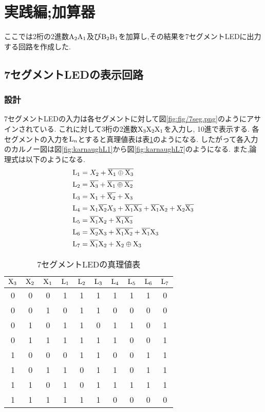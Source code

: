 \section{実践編;加算器}
ここでは2桁の2進数${\rm A_2A_1}$及び${\rm B_2B_1}$を加算し,その結果を7セグメントLEDに出力する回路を作成した.
\subsection{7セグメントLEDの表示回路}
\subsubsection{設計}
7セグメントLEDの入力は各セグメントに対して図\ref{fig:fig/7seg.png}のようにアサインされている.
これに対して3桁の2進数${\rm X_3X_2X_1}$を入力し,
10進で表示する.
各セグメントの入力を${\rm L}_n$とすると真理値表は表\ref{tab:7seg}のようになる.
したがって各入力のカルノー図は図\ref{fig:karnaughL1}から図\ref{fig:karnaughL7}のようになる.
また,論理式は以下のようになる.
\begin{align}
  \begin{split}
    {\rm L}_1&=X_2+\overline{\rm X_1\oplus X_3}\\
    {\rm L}_2&=\overline{\rm X_3}+\overline{\rm X_1\oplus X_2}\\
    {\rm L}_3&={\rm X}_1+\overline{\rm X_2}+{\rm X}_3\\
    {\rm L}_4&={\rm X}_1\overline{\rm X_2}X_3+\overline{\rm X_1X_3}+\overline{\rm X_1}{\rm X}_2+{\rm X}_2\overline{\rm X_3}\\
    {\rm L}_5&=\overline{\rm X_1}{\rm X}_2+\overline{\rm X_1X_3}\\
    {\rm L}_6&=\overline{\rm X_2}{\rm X}_3+\overline{\rm X_1X_2}+\overline{\rm X_1}{\rm X_3}\\
    {\rm L}_7&=\overline{\rm X_1}{\rm X}_2+{\rm X_2}\oplus{\rm X_3}
  \end{split}
\end{align}
\begin{table}[h]
  \centering
  \begin{tabular}{ccc|ccccccc}
\hline
$\rm X_3$ & $\rm X_2$ & $\rm X_1$ & $\rm L_1$ & $\rm L_2$ & $\rm L_3$ & $\rm L_4$ & $\rm L_5$ & $\rm L_6$ & $\rm L_7$\\
\hline \hline
0&0&0&1&1&1&1&1&1&0\\
0&0&1&0&1&1&0&0&0&0\\
0&1&0&1&1&0&1&1&0&1\\
0&1&1&1&1&1&1&0&0&1\\
1&0&0&0&1&1&0&0&1&1\\
1&0&1&1&0&1&1&0&1&1\\
1&1&0&1&0&1&1&1&1&1\\
1&1&1&1&1&1&0&0&0&0\\
\hline
\end{tabular}
\caption{7セグメントLEDの真理値表}
\label{tab:7seg}
\end{table}
